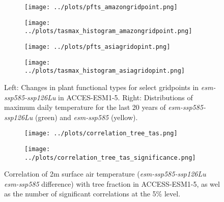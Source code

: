 \documentclass[]{article}
\begin{document}
\begin{figure}[H]
    \centering
    \begin{subfigure}[b]{0.4\linewidth}
        \texttt{[image: ../plots/pfts\_amazongridpoint.png]}
    \end{subfigure}
    \begin{subfigure}[b]{0.4\linewidth}
        \texttt{[image: ../plots/tasmax\_histogram\_amazongridpoint.png]}
    \end{subfigure}
    \begin{subfigure}[b]{0.4\linewidth}
        \texttt{[image: ../plots/pfts\_asiagridopint.png]}
    \end{subfigure}
    \begin{subfigure}[b]{0.4\linewidth}
        \texttt{[image: ../plots/tasmax\_histogram\_asiagridopint.png]}
    \end{subfigure}
    \caption{Left: Changes in plant functional types for select gridpoints in \textit{esm-ssp585-ssp126Lu} in ACCES-ESM1-5. Right: Distributions of maximum daily temperature for the last 20 years of \textit{esm-ssp585-ssp126Lu} (green) and \textit{esm-ssp585} (yellow).}
    \label{fig:tasmax_distribution}
\end{figure}

\begin{figure}[H]
    \centering
    \begin{subfigure}[b]{0.5\linewidth}
        \texttt{[image: ../plots/correlation\_tree\_tas.png]}
    \end{subfigure}

    \begin{subfigure}[b]{0.5\linewidth}
        \texttt{[image: ../plots/correlation\_tree\_tas\_significance.png]}
    \end{subfigure}
    \caption{Correlation of 2m surface air temperature (\textit{esm-ssp585-ssp126Lu} \textit{esm-ssp585} difference) with tree fraction in ACCESS-ESM1-5, as wel as the number of significant correlations at the 5\% level.}
    \label{fig:map_tas_tree_correlation}
\end{figure}
\end{document}
